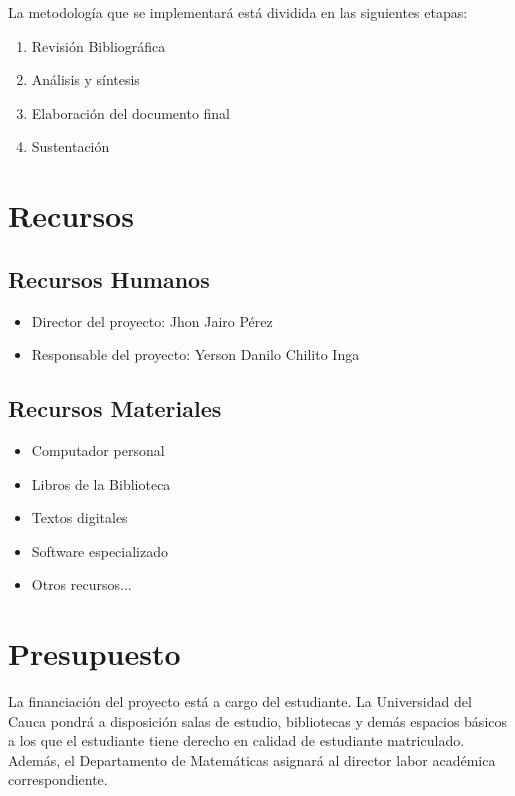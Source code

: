 \documentclass[12pt,letterpaper,oneside]{book}
\theoremstyle{definition}
\theoremstyle{remark}
\newcommand{\nombreAutor}{Yerson Danilo Chilito Inga}
\newcommand{\nombreDirector}{Jhon Jairo Pérez}
\begin{document}
	La metodología que se implementará está dividida en las siguientes etapas:
	
	\begin{enumerate}
		\item[E.1] Revisión Bibliográfica
		\item[E.2] Análisis y síntesis
		\item[E.3] Elaboración del documento final
		\item[E.4] Sustentación
	\end{enumerate}
	
	\chapter{Recursos}
	
	\section{Recursos Humanos}
	
	\begin{itemize}
		\item Director del proyecto: \nombreDirector
		\item Responsable del proyecto: \nombreAutor
	\end{itemize}
	
	\section{Recursos Materiales}
	
	\begin{itemize}
		\item Computador personal
		\item Libros de la Biblioteca
		\item Textos digitales
		\item Software especializado
		\item Otros recursos...
	\end{itemize}
	
	\chapter{Presupuesto}
	
	La financiación del proyecto está a cargo del estudiante. La Universidad del Cauca pondrá a disposición salas de estudio, bibliotecas y demás espacios básicos a los que el estudiante tiene derecho en calidad de estudiante matriculado. Además, el Departamento de Matemáticas asignará al director labor académica correspondiente.
	
\end{document}
